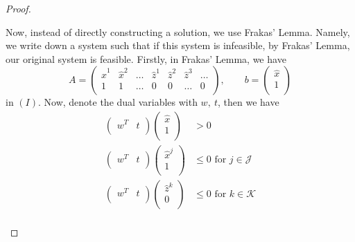 \begin{proof}
\begin{enumerate}
		      Now, instead of directly constructing a solution, we use Frakas' Lemma. Namely, we write down a system such that
		      if this system is infeasible, by Frakas' Lemma, our original system is feasible. Firstly, in Frakas' Lemma, we have
		      \[
			      A = \begin{pmatrix}
				      \hat{x}^1 & \hat{x}^2 & \ldots & \hat{z}^1 & \hat{z}^2 & \hat{z}^3 & \ldots \\
				      1         & 1         & \ldots & 0         & 0         & \ldots    & 0      \\
			      \end{pmatrix},\qquad b = \begin{pmatrix}
				      \hat{x} \\
				      1       \\
			      \end{pmatrix}
		      \]
		      in \((I)\). Now, denote the dual variables with \(w,\ t\), then we have
		      \[
			      \begin{split}
				      \begin{pmatrix}
					      w^{T} & t \\
				      \end{pmatrix}\begin{pmatrix}
					      \hat{x} \\
					      1       \\
				      \end{pmatrix}&>0\\
				      \begin{pmatrix}
					      w^{T} & t \\
				      \end{pmatrix}\begin{pmatrix}
					      \hat{x}^j \\
					      1         \\
				      \end{pmatrix}&\leq 0 \text{ for }j\in\mathcal{J}\\
				      \begin{pmatrix}
					      w^{T} & t \\
				      \end{pmatrix}\begin{pmatrix}
					      \hat{z}^k \\
					      0         \\
				      \end{pmatrix}&\leq 0 \text{ for }k\in\mathcal{K}\\
			      \end{split}
\]
\end{enumerate}
\end{proof}
